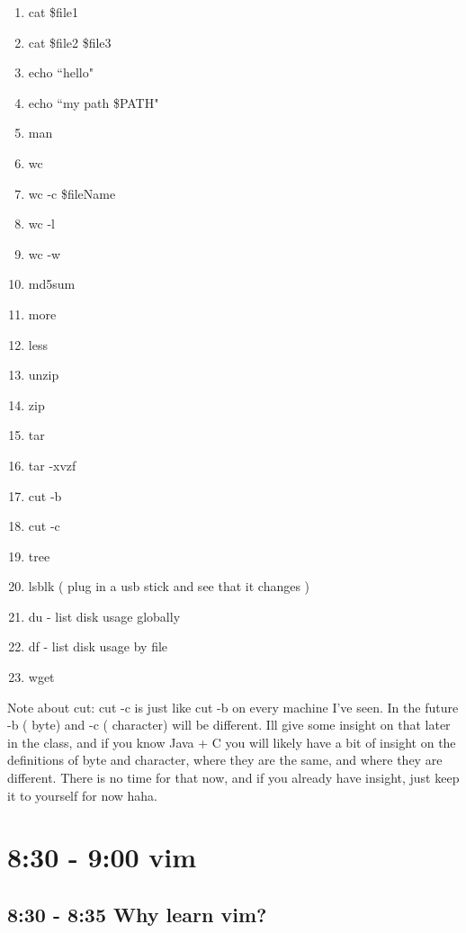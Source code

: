 \documentclass[10pt]{article}
\begin{document}
\begin{multicols}{4}
\begin{enumerate}
\item cat \$file1
\item cat \$file2 \$file3
\item echo ``hello"
\item echo ``my path \$PATH"
\item man
\item wc
\item wc -c \$fileName
\item wc -l
\item wc -w
\item md5sum
\item more
\item less
\item unzip
\item zip
\item tar
\item tar -xvzf
\item cut -b
\item cut -c 
\item tree
\item lsblk ( plug in a usb stick and see that it changes )
\item du - list disk usage globally
\item df - list disk usage by file
\item wget
\end{enumerate}
\end{multicols}

Note about cut: cut -c is just like cut -b on every machine I've seen. In the future -b ( byte) and -c ( character) will be different. Ill give some insight on that later in the class, and if you know Java + C you will likely have a bit of insight on the definitions of byte and character, where they are the same, and where they are different. There is no time for that now, and if you already have insight, just keep it to yourself for now haha.

\section*{8:30 - 9:00 vim}
\subsection{8:30 - 8:35 Why learn vim?}
\end{document}
